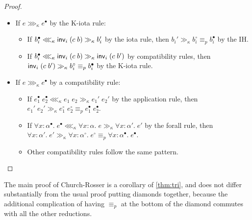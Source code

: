 \begin{proof}
\begin{itemize}
\begin{itemize}
\end{itemize}
\item If $e\ggg_\kappa e^\bullet$ by the K-iota rule:
\begin{itemize}
\item If $b_i^\bullet\lll_\kappa \mathsf{inv}_i\;(c\;b)\gg_\kappa b_i'$ by the iota rule, then $b_i'\gg_\kappa b_i^\circ\equiv_p b_i^\bullet$ by the IH.
\item If $b_i^\bullet\lll_\kappa \mathsf{inv}_i\;(c\;b)\gg_\kappa \mathsf{inv}_i\;(c\;b')$ by compatibility rules, then $\mathsf{inv}_i\;(c\;b')\gg_\kappa b_i^\circ\equiv_p b_i^\bullet$ by the K-iota rule.
\end{itemize}
\item If $e\ggg_\kappa e^\bullet$ by a compatibility rule:
\begin{itemize}
\item If $e_1^\bullet\;e_2^\bullet\lll_\kappa e_1\;e_2\gg_\kappa e_1'\;e_2'$ by the application rule, then $e_1'\;e_2'\gg_\kappa e_1^\circ\;e_2^\circ\equiv_p e_1^\bullet\;e_2^\bullet$.
\item If $\forall x:\alpha^\bullet.\;e^\bullet\lll_\kappa \forall x:\alpha.\;e\gg_\kappa \forall x:\alpha'.\;e'$ by the forall rule, then $\forall x:\alpha'.\;e'\gg_\kappa \forall x:\alpha^\circ.\;e^\circ\equiv_p \forall x:\alpha^\bullet.\;e^\bullet$.
\item Other compatibility rules follow the same pattern.
\end{itemize}
\end{itemize}
\end{proof}
The main proof of Church-Rosser is a corollary of \autoref{thm:tri}, and does not differ substantially from the usual proof putting diamonds together, because the additional complication of having $\equiv_p$ at the bottom of the diamond commutes with all the other reductions.
